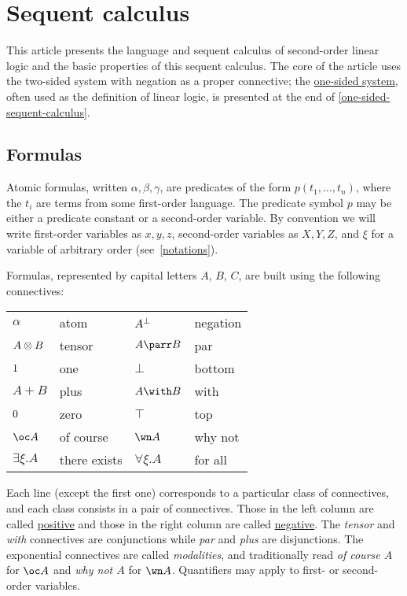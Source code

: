 \chapter{Sequent calculus}\label{sequent-calculus}

This article presents the language and sequent calculus of second-order
linear logic and the basic properties of this sequent calculus. The core
of the article uses the two-sided system with negation as a proper
connective; the \hyperref[one-sided-sequent-calculus]{one-sided
system}, often used as the definition of linear logic, is presented at
the end of \cref{one-sided-sequent-calculus}.

\section{Formulas}\label{formulas}

Atomic formulas, written \(\alpha,\beta,\gamma\), are predicates of the
form \(p(t_1,\ldots,t_n)\), where the \(t_i\) are terms from some
first-order language. The predicate symbol \(p\) may be either a
predicate constant or a second-order variable. By convention we will
write first-order variables as \(x,y,z\), second-order variables as
\(X,Y,Z\), and \(\xi\) for a variable of arbitrary order (see~\cref{notations}).

Formulas, represented by capital letters \(A\), \(B\), \(C\), are built
using the following connectives:
\begin{center}
\begin{tabular}{llll}
\hline
\(\alpha\) & atom & \(A^\bot\) & negation\\
\(A \otimes B\) & tensor & \(A \parr B\) & par\\
\(1\) & one & \(\bot\) & bottom\\
\(A \plus B\) & plus & \(A \with B\) & with\\
\(0\) & zero & \(\top\) & top\\
\(\oc A\) & of course & \(\wn A\) & why not\\
\(\exists \xi.A\) & there exists & \(\forall \xi.A\) & for
all\\
\hline
\end{tabular}
\end{center}

Each line (except the first one) corresponds to a particular class of
connectives, and each class consists in a pair of connectives. Those in
the left column are called \hyperref[positive-formula]{positive} and those
in the right column are called \hyperref[negative-formula]{negative}. The
\emph{tensor} and \emph{with} connectives are conjunctions while
\emph{par} and \emph{plus} are disjunctions. The exponential connectives
are called \emph{modalities}, and traditionally read \emph{of course
\(A\)} for \(\oc A\) and \emph{why not \(A\)} for \(\wn A\). Quantifiers
may apply to first- or second-order variables.

